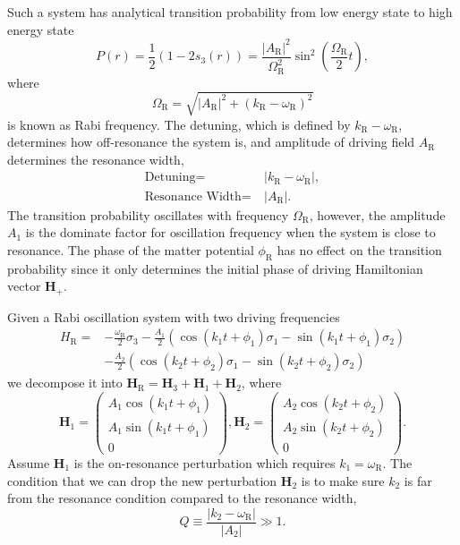 \documentclass[%
reprint,
 amsmath,amssymb,
 aps,
]{revtex4-1}
\begin{document}
Such a system has analytical transition probability from low energy state to high energy state
\begin{equation}
    P(r) = \frac{1}{2}(1- 2 s_3(r))= \frac{\left \lvert A_{\mathrm{R}} \right \rvert ^2}{ \Omega_{\mathrm R}^2 } \sin^2 \left( \frac{\Omega_{\mathrm R}}{2} t \right),
    \label{rabi-system-transition-probability}
\end{equation}
where
\begin{equation}
\Omega_{\mathrm R} = \sqrt{ \lvert A_{\mathrm{R}}\rvert^2 + (k_{\mathrm{R}} - \omega_{\mathrm R})^2 }
\end{equation} is known as Rabi frequency. The detuning, which is defined by $k_{\mathrm{R}} - \omega_{\mathrm R}$, determines how off-resonance the system is, and amplitude of driving field $A_{\mathrm{R}}$ determines the resonance width,
\begin{align}
\text{Detuning} =&~\lvert k_{\mathrm{R}} - \omega_{\mathrm R} \rvert, \\
\text{Resonance Width} =&~\lvert A_{\mathrm R} \rvert.
\end{align}
The transition probability oscillates with frequency $\Omega_{\mathrm R}$, however, the amplitude $A_1$ is the dominate factor for oscillation frequency when the system is close to resonance. The phase of the matter potential $\phi_{\mathrm{R}}$ has no effect on the transition probability since it only determines the initial phase of driving Hamiltonian vector $\mathbf{H}_+$.

Given a Rabi oscillation system with two driving frequencies
\begin{align*}
    H_{\mathrm R} =& -\frac{\omega_{\mathrm R}}{2}\sigma_3 - \frac{A_{1} }{2}  \left( \cos(k_{1} t +\phi_{1})\sigma_1  - \sin(k_{1} t +\phi_{1}) \sigma_2\right) \nonumber\\
    & - \frac{A_{2} }{2}  \left( \cos(k_{2} t +\phi_{2})\sigma_1  - \sin(k_{2} t +\phi_{2}) \sigma_2\right)
\end{align*}
we decompose it into $\mathbf{H}_{\mathrm R}=\mathbf{H}_3 + \mathbf{H}_{1} + \mathbf{H}_2$, where
\begin{equation*}
    \mathbf{H}_1 =  \begin{pmatrix}
     A_{1} \cos(k_{1}t+\phi_{1}) \\
     A_{1} \sin(k_{1}t+\phi_{1})  \\
     0
      \end{pmatrix},   \mathbf{H}_2 =  \begin{pmatrix}
     A_{2} \cos(k_{2}t+\phi_{2}) \\
     A_{2} \sin(k_{2}t+\phi_{2})  \\
     0
      \end{pmatrix}.
\end{equation*}
Assume $\mathbf{H}_1$ is the on-resonance perturbation which requires $k_1 = \omega_{\mathrm{R}}$. The condition that we can drop the new perturbation $\mathbf{H}_2$ is to make sure $k_2$ is far from the resonance condition compared to the resonance width,
\begin{equation}
Q \equiv \frac{\lvert k_2 -\omega_{\mathrm R}\rvert}{\lvert A_2\rvert} \gg 1.
\end{equation}



 



\end{document}
